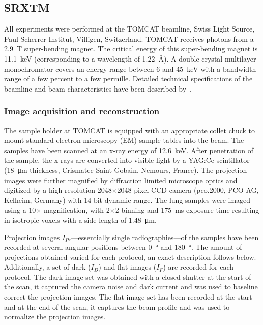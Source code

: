 \subsection{SRXTM}
All experiments were performed at the TOMCAT beamline, Swiss Light Source, Paul Scherrer Institut, Villigen, Switzerland. %
TOMCAT receives photons from a \SI{2.9}{\tesla} super-bending magnet. The critical energy of this super-bending magnet is \SI{11.1}{\kilo\electronvolt} (corresponding to a wavelength of \SI{1.22}{\angstrom}). A double crystal multilayer monochromator covers an energy range between 6 and \SI{45}{\kilo\electronvolt} with a bandwidth range of a few percent to a few permille. Detailed technical specifications of the beamline and beam characteristics have been described by~\citet{Stampanoni2006a,Stampanoni2007}.

\subsubsection{Image acquisition and reconstruction}
\label{seq:Image Acquisition}
The sample holder at TOMCAT is equipped with an appropriate collet chuck to mount standard electron microscopy (EM) sample tables into the beam. The samples have been scanned at an x-ray energy of \SI{12.6}{\kilo\electronvolt}. After penetration of the sample, the x-rays are converted into visible light by a YAG:Ce scintillator (\SI{18}{\micro\meter} thickness, Crismatec Saint-Gobain, Nemours, France). The projection images were further magnified by diffraction limited microscope optics and digitized by a high-resolution 2048$\times$2048 pixel CCD camera (pco.2000, PCO AG, Kelheim, Germany) with 14 bit dynamic range. %
The lung samples were imaged using a 10$\times$ magnification, with 2$\times$2 binning and \SI{175}{\milli\second} exposure time resulting in isotropic voxels with a side length of \SI{1.48}{\micro\meter}.

\cbstart
Projection images $I_{Pr}$---essentially single radiographies---of the samples have been recorded at several angular positions between \SI{0}{\degree} and \SI{180}{\degree}. The amount of projections obtained varied for each protocol, an exact description follows below. Additionally, a set of dark ($I_{D}$) and flat images ($I_{F}$) are recorded for each protocol. The dark image set was obtained with a closed shutter at the start of the scan, it captured the camera noise and dark current and was used to baseline correct the projection images. The flat image set has been recorded at the start and at the end of the scan, it captures the beam profile and was used to normalize the projection images.

